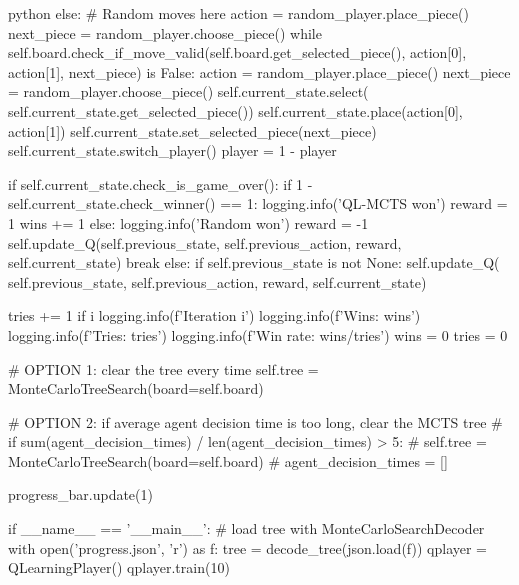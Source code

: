\begin{mintedbox}{python}
                else:
                    # Random moves here
                    action = random_player.place_piece()
                    next_piece = random_player.choose_piece()
                    while self.board.check_if_move_valid(self.board.get_selected_piece(), action[0], action[1], next_piece) is False:
                        action = random_player.place_piece()
                        next_piece = random_player.choose_piece()
                    self.current_state.select(
                        self.current_state.get_selected_piece())
                    self.current_state.place(action[0], action[1])
                    self.current_state.set_selected_piece(next_piece)
                    self.current_state.switch_player()
                    player = 1 - player

                if self.current_state.check_is_game_over():
                    if 1 - self.current_state.check_winner() == 1:
                        logging.info('QL-MCTS won')
                        reward = 1
                        wins += 1
                    else:
                        logging.info('Random won')
                        reward = -1
                    self.update_Q(self.previous_state, self.previous_action,
                                    reward, self.current_state)
                    break
                else:
                    if self.previous_state is not None:
                        self.update_Q(
                            self.previous_state, self.previous_action, reward, self.current_state)

            tries += 1
            if i %
                logging.info(f'Iteration {i}')
                logging.info(f'Wins: {wins}')
                logging.info(f'Tries: {tries}')
                logging.info(f'Win rate: {wins/tries}')
                wins = 0
                tries = 0

            # OPTION 1: clear the tree every time
            self.tree = MonteCarloTreeSearch(board=self.board)

            # OPTION 2: if average agent decision time is too long, clear the MCTS tree
            # if sum(agent_decision_times) / len(agent_decision_times) > 5:
            #     self.tree = MonteCarloTreeSearch(board=self.board)
            #     agent_decision_times = []

            progress_bar.update(1)


if __name__ == '__main__':
    # load tree with MonteCarloSearchDecoder
    with open('progress.json', 'r') as f:
        tree = decode_tree(json.load(f))
    qplayer = QLearningPlayer()
    qplayer.train(10)

\end{mintedbox}

